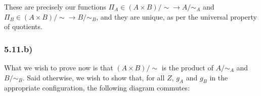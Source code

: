 \documentclass[12pt, letterpaper, twoside]{report}
\begin{document}

These are precisely our functions $\Pi_A \in (A \times B)/\sim \to A/\sim_A$ and $\Pi_B \in (A \times B)/\sim \to B/\sim_B$, and they are unique, as per the universal property of quotients.


\subsubsection*{5.11.b)}

What we wish to prove now is that $(A \times B)/\sim$ is the product of $A/\sim_A$ and $B/\sim_B$. Said otherwise, we wish to show that, for all $Z$, $g_A$ and $g_B$ in the appropriate configuration, the following diagram commutes:

\end{document}
